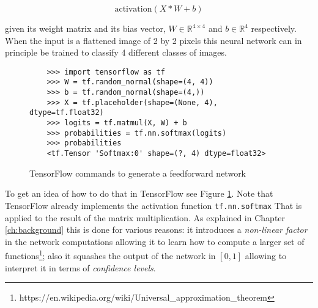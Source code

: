 \[ \text{activation}(X * W + b) \]

given its weight matrix and its bias vector, \( W \in \mathbb{R}^{4
  \times 4} \) and \( b \in \mathbb{R}^{4}\) respectively. When the
input is a flattened image of 2 by 2 pixels this neural network can in
principle be trained to classify 4 different classes of images.

\begin{figure}
  \begin{verbatim}
    >>> import tensorflow as tf
    >>> W = tf.random_normal(shape=(4, 4))
    >>> b = tf.random_normal(shape=(4,))
    >>> X = tf.placeholder(shape=(None, 4), dtype=tf.float32)
    >>> logits = tf.matmul(X, W) + b
    >>> probabilities = tf.nn.softmax(logits)
    >>> probabilities
    <tf.Tensor 'Softmax:0' shape=(?, 4) dtype=float32>
  \end{verbatim}
  \caption{TensorFlow commands to generate a feedforward network}
  \label{fig:tensorflow-feedforward}
\end{figure}

To get an idea of how to do that in TensorFlow see Figure
\ref{fig:tensorflow-feedforward}. Note that TensorFlow already
implements the activation function \texttt{tf.nn.softmax} That is
applied to the result of the matrix multiplication. As explained in
Chapter \ref{ch:background} this is done for various reasons: it
introduces a \emph{non-linear factor} in the network computations
allowing it to learn how to compute a larger set of
functions\footnote{https://en.wikipedia.org/wiki/Universal\_approximation\_theorem};
also it squashes the output of the network in $[0,1]$ allowing to
interpret it in terms of \emph{confidence levels}.

